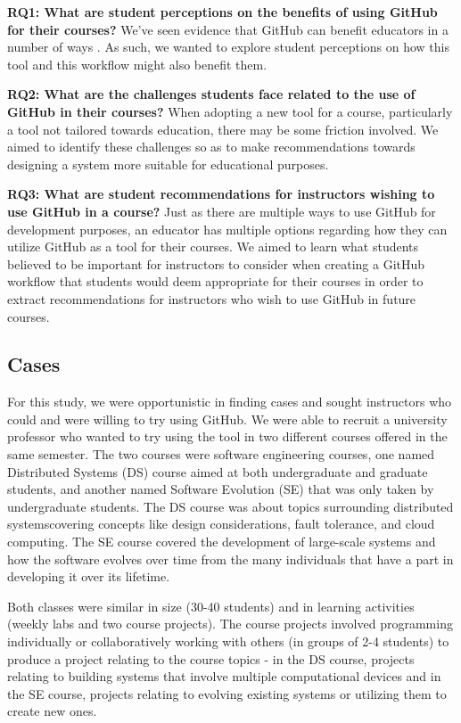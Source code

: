 \textbf{RQ1: What are student perceptions on the benefits of using GitHub for their courses?} We've seen evidence that GitHub can benefit educators in a number of ways \cite{zagalsky2015emergence}. As such, we wanted to explore student perceptions on how this tool and this workflow might also benefit them.

\textbf{RQ2: What are the challenges students face related to the use of GitHub in their courses?} When adopting a new tool for a course, particularly a tool not tailored towards education, there may be some friction involved. We aimed to identify these challenges so as to make recommendations towards designing a system more suitable for educational purposes.

\textbf{RQ3: What are student recommendations for instructors wishing to use GitHub in a course?} Just as there are multiple ways to use GitHub for development purposes, an educator has multiple options regarding how they can utilize GitHub as a tool for their courses. We aimed to learn what students believed to be important for instructors to consider when creating a GitHub workflow that students would deem appropriate for their courses in order to extract recommendations for instructors who wish to use GitHub in future courses.

\subsection{Cases}
For this study, we were opportunistic in finding cases and sought instructors who could and were willing to try using GitHub. We were able to recruit a university professor who wanted to try using the tool in two different courses offered in the same semester. The two courses were software engineering courses, one named Distributed Systems (DS) course aimed at both undergraduate and graduate students, and another named Software Evolution (SE) that was only taken by undergraduate students. The DS course was about topics surrounding distributed systemscovering concepts like design considerations, fault tolerance, and cloud computing. The SE course covered the development of large-scale systems and how the software evolves over time from the many individuals that have a part in developing it over its lifetime.

Both classes were similar in size (30-40 students) and in learning activities (weekly labs and two course projects). The course projects involved programming individually or collaboratively working with others (in groups of 2-4 students) to produce a project relating to the course topics - in the DS course, projects relating to building systems that involve multiple computational devices and in the SE course, projects relating to evolving existing systems or utilizing them to create new ones.

